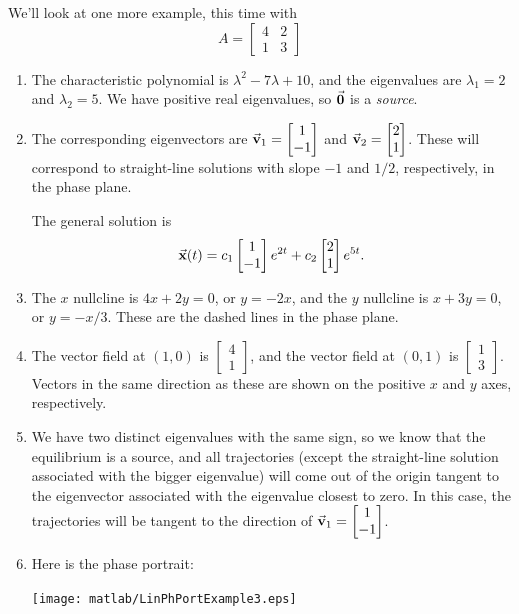 \newpage

\begin{xexample}
We'll look at one more example, this time with
\[
   A = \begin{bmatrix}
            4 & 2 \\ 1 & 3
       \end{bmatrix}
\]
\begin{enumerate}
\item
The characteristic polynomial is
$\lambda^2 -7\lambda +10$, and the eigenvalues are
$\lambda_1 = 2$ and $\lambda_2 = 5$.
We have positive real eigenvalues, so
$\vec{\textbf{0}}$ is a \emph{source}.
\item
The corresponding eigenvectors are
$\vec{\textbf{v}}_1 = \begin{bmatrix} 1 \\ -1 \end{bmatrix}$
and
$\vec{\textbf{v}}_2 = \begin{bmatrix} 2 \\ 1 \end{bmatrix}$.
These will correspond to straight-line solutions with
slope $-1$ and $1/2$, respectively, in the phase plane.

The general solution is
\begin{equation}
\vec{\textbf{x}}(t) = c_1 \begin{bmatrix} 1 \\ -1 \end{bmatrix} e^{2t}
   + c_2 \begin{bmatrix} 2 \\ 1 \end{bmatrix} e^{5t}.
\end{equation}
\item
The $x$ nullcline is $4x+2y=0$, or $y = -2x$, and the
$y$ nullcline is $x+3y=0$, or $y=-x/3$.  These are the
dashed lines in the phase plane.
\item
The vector field at $(1,0)$ is $\begin{bmatrix} 4 \\ 1 \end{bmatrix}$,
and the vector field at $(0,1)$
is $\begin{bmatrix} 1 \\ 3 \end{bmatrix}$.  Vectors in the
same direction as these are shown on the positive $x$ and $y$ axes,
respectively.
\item We have two distinct eigenvalues with the same sign, so
we know that the equilibrium is a source, and all trajectories
(except the straight-line solution associated with the
bigger eigenvalue) will come out of the origin
tangent to the eigenvector associated with the eigenvalue
closest to zero.  In this case, the trajectories will
be tangent to the direction of
$\vec{\textbf{v}}_1 = \begin{bmatrix}1 \\ -1 \end{bmatrix}$.
\item
Here is the phase portrait:

\noindent
\centerline{\texttt{[image: matlab/LinPhPortExample3.eps]}}
\end{enumerate}
\end{xexample}
%
\newpage

